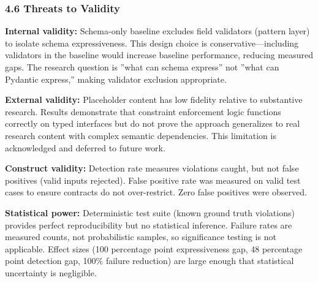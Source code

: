\subsubsection{4.6 Threats to Validity}

\textbf{Internal validity:} Schema-only baseline excludes field validators (pattern layer) to isolate schema expressiveness. This design choice is conservative---including validators in the baseline would increase baseline performance, reducing measured gaps. The research question is ''what can schema express'' not ''what can Pydantic express,'' making validator exclusion appropriate.

\textbf{External validity:} Placeholder content has low fidelity relative to substantive research. Results demonstrate that constraint enforcement logic functions correctly on typed interfaces but do not prove the approach generalizes to real research content with complex semantic dependencies. This limitation is acknowledged and deferred to future work.

\textbf{Construct validity:} Detection rate measures violations caught, but not false positives (valid inputs rejected). False positive rate was measured on valid test cases to ensure contracts do not over-restrict. Zero false positives were observed.

\textbf{Statistical power:} Deterministic test suite (known ground truth violations) provides perfect reproducibility but no statistical inference. Failure rates are measured counts, not probabilistic samples, so significance testing is not applicable. Effect sizes (100 percentage point expressiveness gap, 48 percentage point detection gap, 100\% failure reduction) are large enough that statistical uncertainty is negligible.
